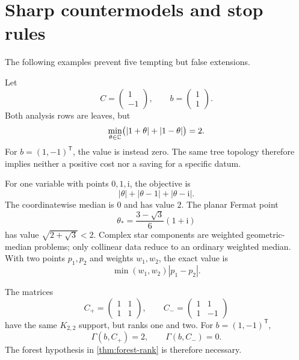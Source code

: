 \section{Sharp countermodels and stop rules}
\label{sec:countermodels}

The following examples prevent five tempting but false extensions.

\begin{example}\label{ex:row-leaf}
Let
\[
 C=\begin{pmatrix}1\\-1\end{pmatrix},
 \qquad
 b=\begin{pmatrix}1\\1\end{pmatrix}.
\]
Both analysis rows are leaves, but
\[
 \min_{\theta\in\mathbb C}
 \bigl(|1+\theta|+|1-\theta|\bigr)=2.
\]
For \(b=(1,-1)^\mathsf T\), the value is instead zero.  The same tree
topology therefore implies neither a positive cost nor a saving for a
specific datum.
\end{example}

\begin{example}\label{ex:median}
For one variable with points \(0,1,\mathrm i\), the objective is
\[
 |\theta|+|\theta-1|+|\theta-\mathrm i|.
\]
The coordinatewise median is \(0\) and has value \(2\).  The planar
Fermat point
\[
 \theta_*=\frac{3-\sqrt3}{6}(1+\mathrm i)
\]
has value \(\sqrt{2+\sqrt3}<2\).  Complex star components are weighted
geometric-median problems; only collinear data reduce to an ordinary
weighted median.  With two points \(p_1,p_2\) and weights \(w_1,w_2\),
the exact value is
\[
 \min(w_1,w_2)|p_1-p_2|.
\]
\end{example}

\begin{example}\label{ex:cycle-rank}
The matrices
\[
 C_+=\begin{pmatrix}1&1\\1&1\end{pmatrix},
 \qquad
 C_-=\begin{pmatrix}1&1\\1&-1\end{pmatrix}
\]
have the same \(K_{2,2}\) support, but ranks one and two.  For
\(b=(1,-1)^\mathsf T\),
\[
 \Gamma(b,C_+)=2,
 \qquad
 \Gamma(b,C_-)=0.
\]
The forest hypothesis in \cref{thm:forest-rank} is therefore necessary.
\end{example}

